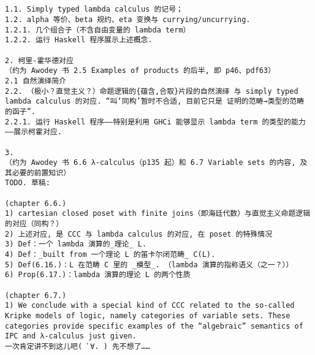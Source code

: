 \documentclass{article}
\begin{document}
\begin{verbatim}


1.1. Simply typed lambda calculus 的记号；
1.2. alpha 等价、beta 规约、eta 变换与 currying/uncurrying. 
1.2.1. 几个组合子（不含自由变量的 lambda term）
1.2.2. 运行 Haskell 程序展示上述概念. 

2. 柯里-霍华德对应
（约为 Awodey 书 2.5 Examples of products 的后半, 即 p46、pdf63）
2.1 自然演绎简介
2.2. （极小？直觉主义？）命题逻辑的{蕴含,合取}片段的自然演绎 与 simply typed lambda calculus 的对应. “叫‘同构’暂时不合适, 目前它只是 证明的范畴→类型的范畴 的函子”. 
2.2.1. 运行 Haskell 程序——特别是利用 GHCi 能够显示 lambda term 的类型的能力——展示柯霍对应. 

3. 
（约为 Awodey 书 6.6 λ-calculus（p135 起）和 6.7 Variable sets 的内容, 及其必要的前置知识）
TODO. 草稿:

(chapter 6.6.)
1) cartesian closed poset with finite joins（即海廷代数）与直觉主义命题逻辑的对应（同构？）
2) 上述对应, 是 CCC 与 lambda calculus 的对应, 在 poset 的特殊情况
3) Def：一个 lambda 演算的_理论_ L. 
4) Def：_built from 一个理论 L 的笛卡尔闭范畴_ C(L). 
5) Def(6.16.)：L 在范畴 C 里的 _模型_. （lambda 演算的指称语义（之一？））
6) Prop(6.17.)：lambda 演算的理论 L 的两个性质

(chapter 6.7.)
1) We conclude with a special kind of CCC related to the so-called Kripke models of logic, namely categories of variable sets. These categories provide specific examples of the “algebraic” semantics of IPC and λ-calculus just given.
一次肯定讲不到这儿吧( ﾟ∀. ) 先不想了……    
\end{verbatim}
	
\end{document}
